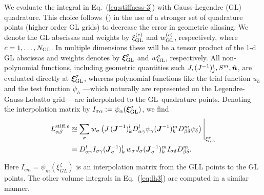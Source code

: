 We evaluate the integral in Eq.~(\ref{eq:stiffness-3}) with Gauss-Legendre (GL) quadrature.
This choice follows~(\cite{mengaldo2015dealiasing}) in the use of a stronger set of quadrature points
 (higher order GL grids) to decrease the error in geometric aliasing.  We denote the GL abscissas and weights by $\xi_{\rm GL}^{(c)}$ and $w_{\rm GL}^{(c)}$, respectively, where $c=1,\ldots, N_{\rm GL}$.  In multiple dimensions these will be a tensor product of the 1-d GL abscissas and weights denotes by $\boldsymbol{\xi}^\sigma_{\rm GL}$ and $w^\sigma_{\rm GL}$, respectively.  All non-polynomial functions,
including geometric quantities such $J, (J^{-1})^i_j, S^m, \Hat{\boldsymbol{n}}$, are evaluated directly at $\boldsymbol{\xi}^\sigma_{\rm GL}$, whereas polynomial functions like the trial
function $u_h$ and the test function $\psi_h$ ---which naturally are represented 
on the Legendre-Gauss-Lobatto grid--- are interpolated to
the GL--quadrature points. Denoting the interpolation matrix by $I_{\sigma\alpha}:=\psi_\alpha(\boldsymbol{\xi}^\sigma_{\rm GL})$, we find
\begin{align}
L^{\text{stiff},e}_{\alpha\beta}
      &\approxeq \sum_\sigma w_\sigma
    \left(J\,
    (\boldsymbol{J}^{-1})^l_kD^l_{\alpha\gamma}\psi_{\gamma}
    (\boldsymbol{J}^{-1})^m_kD^m_{\beta\delta}\psi_{\delta}
    \right)\Bigg|_{\xi^\sigma_{GL}} \\
    &=   D^l_{\alpha\gamma}I_{\sigma\gamma}(\boldsymbol{J}_\sigma^{-1})^l_k\, w_\sigma J_\sigma (\boldsymbol{J}_\sigma^{-1})^m_k I_{\sigma\delta} D^m_{\beta\delta}  \label{eq:harald-stiff}.
\end{align}



Here $I_{cm} = \psi_m(\xi^\zeta_{GL})$ is an interpolation matrix from
the GLL points to the GL points.
%
%
The other volume integrals in Eq.~(\ref{eq:lh3})
are computed in a similar manner.


